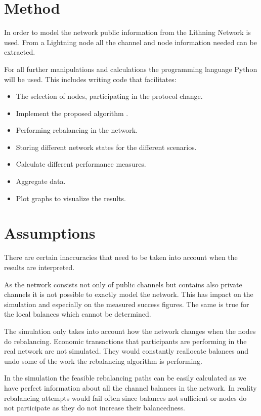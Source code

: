 \documentclass[final]{fhnwreport}       %
\begin{document}
\section{Method}

In order to model the network public information from the Lithning Network is used. From a Lightning node all the channel and node information needed can be extracted.

For all further manipulations and calculations the programming language Python will be used. This includes writing code that facilitates: 
\begin{itemize}
  \item The selection of nodes, participating in the protocol change.
  \item Implement the proposed algorithm \cite[p.~3]{pickhardt_imbalance_2019}.
  \item Performing rebalancing in the network.
  \item Storing different network states for the different scenarios.
  \item Calculate different performance measures.
  \item Aggregate data.
  \item Plot graphs to visualize the results.
\end{itemize}

\section{Assumptions}
There are certain inaccuracies that need to be taken into account when the results are interpreted. 

As the network consists not only of public channels but contains also private channels it is not possible to exactly model the network. This has impact on the simulation and especially on the measured success figures. The same is true for the local balances which cannot be determined. 

The simulation only takes into account how the network changes when the nodes do rebalancing. Economic transactions that participants are performing in the real network are not simulated. They would constantly reallocate balances and undo some of the work the rebalancing algorithm is performing.

In the simulation the feasible rebalancing paths can be easily calculated as we have perfect information about all the channel balances in the network. In reality rebalancing attempts would fail often since balances not sufficient or nodes do not participate as they do not increase their balancedness.
\end{document}
